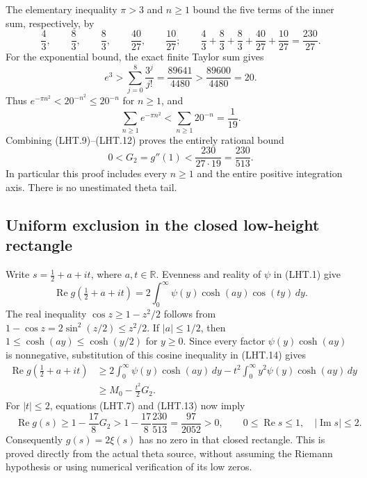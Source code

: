 The elementary inequality $\pi>3$ and $n\geq1$ bound the five
terms of the inner sum, respectively, by
\[
 \frac43,\qquad \frac83,\qquad \frac83,
 \qquad \frac{40}{27},\qquad \frac{10}{27};
 \qquad
 \frac43+\frac83+\frac83+\frac{40}{27}+\frac{10}{27}
       =\frac{230}{27}.
\tag{LHT.10}
\]
For the exponential bound, the exact finite Taylor sum gives
\[
 e^3>\sum_{j=0}^{8}\frac{3^j}{j!}
      =\frac{89641}{4480}>\frac{89600}{4480}=20.
\tag{LHT.11}
\]
Thus $e^{-\pi n^2}<20^{-n^2}\leq20^{-n}$ for $n\geq1$, and
\[
 \sum_{n\geq1}e^{-\pi n^2}<
 \sum_{n\geq1}20^{-n}=\frac1{19}.
 \tag{LHT.12}
\]
Combining (LHT.9)--(LHT.12) proves the entirely rational bound
\[
 0<G_2=g''(1)<\frac{230}{27\cdot19}
                  =\frac{230}{513}.
\tag{LHT.13}
\]
In particular this proof includes every $n\geq1$ and the entire
positive integration axis.  There is no unestimated theta tail.

\subsection{Uniform exclusion in the closed low-height rectangle}

Write $s=\frac12+a+it$, where $a,t\in\mathbb R$.
Evenness and reality of $\psi$ in (LHT.1) give
\[
 \operatorname{Re}g(\tfrac12+a+it)
 =2\int_0^\infty\psi(y)\cosh(ay)\cos(ty)\,dy.
\tag{LHT.14}
\]
The real inequality $\cos z\geq1-z^2/2$ follows from
$1-\cos z=2\sin^2(z/2)\leq z^2/2$.  If $|a|\leq1/2$, then
$1\leq\cosh(ay)\leq\cosh(y/2)$ for $y\geq0$.
Since every factor $\psi(y)\cosh(ay)$ is nonnegative, substitution
of this cosine inequality in (LHT.14) gives
\[
 \begin{split}
 \operatorname{Re}g(\tfrac12+a+it)
 &\geq 2\int_0^\infty\psi(y)\cosh(ay)\,dy
       -t^2\int_0^\infty y^2\psi(y)\cosh(ay)\,dy\\
 &\geq M_0-\frac{t^2}{2}G_2.
 \end{split}
\tag{LHT.15}
\]
For $|t|\leq2$, equations (LHT.7) and (LHT.13) now imply
\[
 \boxed{\quad
 \operatorname{Re}g(s)
 \geq1-\frac{17}{8}G_2
 >1-\frac{17}{8}\frac{230}{513}
 =\frac{97}{2052}>0,
 \qquad 0\leq\operatorname{Re}s\leq1,
 \quad |\operatorname{Im}s|\leq2.
 \quad}
\tag{LHT.16}
\]
Consequently $g(s)=2\xi(s)$ has no zero in that closed rectangle.
This is proved directly from the actual theta source, without
assuming the Riemann hypothesis or using numerical verification
of its low zeros.

